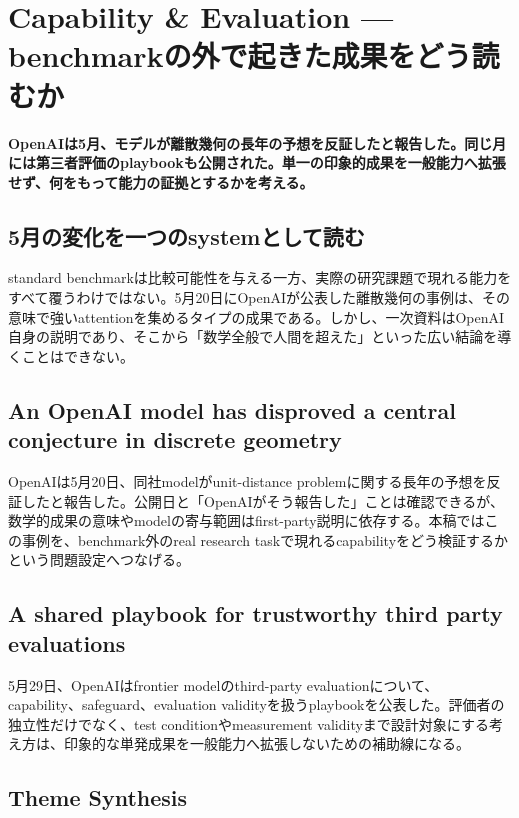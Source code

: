 \section{Capability \& Evaluation — benchmarkの外で起きた成果をどう読むか}
\noindent\textbf{OpenAIは5月、モデルが離散幾何の長年の予想を反証したと報告した。同じ月には第三者評価のplaybookも公開された。単一の印象的成果を一般能力へ拡張せず、何をもって能力の証拠とするかを考える。}\autocite{src-1c93d6c1c725,src-8c84b8422093}

\subsection{5月の変化を一つのsystemとして読む}

standard benchmarkは比較可能性を与える一方、実際の研究課題で現れる能力をすべて覆うわけではない。5月20日にOpenAIが公表した離散幾何の事例は、その意味で強いattentionを集めるタイプの成果である。しかし、一次資料はOpenAI自身の説明であり、そこから「数学全般で人間を超えた」といった広い結論を導くことはできない。\autocite{src-1c93d6c1c725,src-8c84b8422093}


\subsection{An OpenAI model has disproved a central conjecture in discrete geometry}

OpenAIは5月20日、同社modelがunit-distance problemに関する長年の予想を反証したと報告した。公開日と「OpenAIがそう報告した」ことは確認できるが、数学的成果の意味やmodelの寄与範囲はfirst-party説明に依存する。本稿ではこの事例を、benchmark外のreal research taskで現れるcapabilityをどう検証するかという問題設定へつなげる。\autocite{src-1c93d6c1c725}


\subsection{A shared playbook for trustworthy third party evaluations}

5月29日、OpenAIはfrontier modelのthird-party evaluationについて、capability、safeguard、evaluation validityを扱うplaybookを公表した。評価者の独立性だけでなく、test conditionやmeasurement validityまで設計対象にする考え方は、印象的な単発成果を一般能力へ拡張しないための補助線になる。\autocite{src-8c84b8422093}


\subsection{Theme Synthesis}

